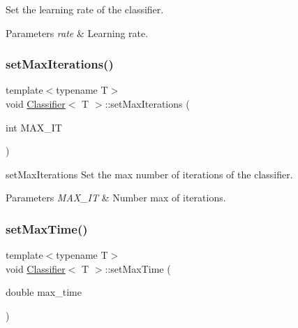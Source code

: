 Set the learning rate of the classifier. 


\begin{DoxyParams}{Parameters}
{\em rate} & Learning rate. \\
\hline
\end{DoxyParams}
\mbox{\label{class_classifier_af3ea28f2e4b7ea19469892ec901b5bb6}} 
\subsubsection{\texorpdfstring{set\+Max\+Iterations()}{setMaxIterations()}}
{\footnotesize\ttfamily template$<$typename T$>$ \\
void \mbox{\hyperlink{class_classifier}{Classifier}}$<$ T $>$\+::set\+Max\+Iterations (\begin{DoxyParamCaption}\item[{int}]{M\+A\+X\+\_\+\+IT }\end{DoxyParamCaption})\hspace{0.3cm}{\ttfamily [inline]}}



set\+Max\+Iterations Set the max number of iterations of the classifier. 


\begin{DoxyParams}{Parameters}
{\em M\+A\+X\+\_\+\+IT} & Number max of iterations. \\
\hline
\end{DoxyParams}
\mbox{\label{class_classifier_a1919729daad9103144bffbd189b9fac9}} 
\subsubsection{\texorpdfstring{set\+Max\+Time()}{setMaxTime()}}
{\footnotesize\ttfamily template$<$typename T$>$ \\
void \mbox{\hyperlink{class_classifier}{Classifier}}$<$ T $>$\+::set\+Max\+Time (\begin{DoxyParamCaption}\item[{double}]{max\+\_\+time }\end{DoxyParamCaption})\hspace{0.3cm}{\ttfamily [inline]}}



